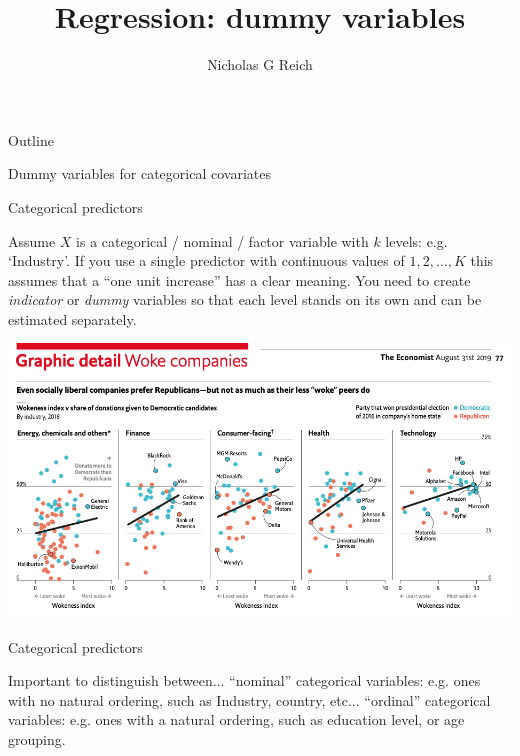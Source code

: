 \documentclass[table]{beamer}\usepackage[]{graphicx}\usepackage[]{color}
\title{Regression: dummy variables}
\author{Nicholas G Reich}
\begin{document}
\begin{frame}[plain]
	\titlepage
\end{frame}







\begin{frame}{Outline}



\bi
  \myitem Dummy variables for categorical covariates
\ei

\end{frame}






\begin{frame}{Categorical predictors}

\bi
	\myitem Assume $X$ is a categorical / nominal / factor variable with $k$ levels: e.g. `Industry'.
	\myitem If you use a single predictor with continuous values of $1, 2, \ldots, K$ this assumes that a ``one unit increase'' has a clear meaning.
	\myitem You need to create {\it indicator} or {\it dummy} variables so that each level stands on its own and can be estimated separately.
\ei

\centering
\includegraphics[width=.7\textwidth]{figure-static/woke-factors.png}

\end{frame}


\begin{frame}{Categorical predictors}

\begin{block}{Important to distinguish between...}
\bi
	\myitem  ``nominal'' categorical variables: e.g. ones with no natural ordering, such as Industry, country, etc...
	\myitem ``ordinal'' categorical variables: e.g. ones with a natural ordering, such as education level, or age grouping.
\ei
\end{block}

\end{frame}
\end{document}
